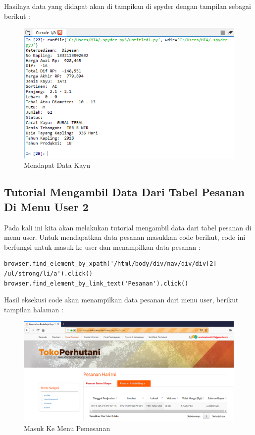 Hasilnya data yang didapat akan di tampikan di spyder dengan tampilan sebagai berikut :
\begin{figure}[h]
	\centering
	\includegraphics[scale=0.6]{figures/mendapatdatakayu}
	\caption{Mendapat Data Kayu}
\end{figure}

\subsection{Tutorial Mengambil Data Dari Tabel Pesanan Di Menu User 2}
Pada kali ini kita akan melakukan tutorial mengambil data dari tabel pesanan di menu user. Untuk mendapatkan data pesanan masukkan code berikut, code ini berfungsi untuk masuk ke user dan menampilkan data pesanan :
\begin{verbatim}
browser.find_element_by_xpath('/html/body/div/nav/div/div[2]
/ul/strong/li/a').click()
browser.find_element_by_link_text('Pesanan').click()
\end{verbatim}

Hasil eksekusi code akan menampilkan data pesanan dari menu user, berikut tampilan halaman :
\begin{figure}[h]
	\centering
	\includegraphics[scale=0.3]{figures/datapesanan}
	\caption{Masuk Ke Menu Pemesanan}
\end{figure}

